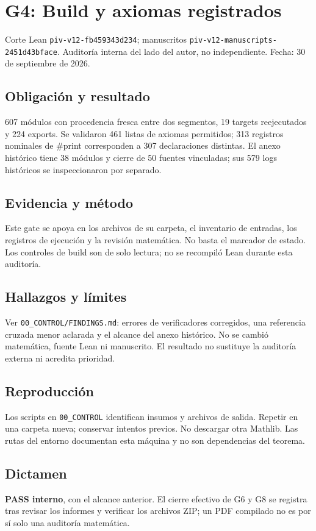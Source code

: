 \section{G4: Build y axiomas
registrados}\label{g4-build-y-axiomas-registrados}

Corte Lean \texttt{piv-v12-fb459343d234}; manuscritos
\texttt{piv-v12-manuscripts-2451d43bface}. Auditoría interna del lado
del autor, no independiente. Fecha: 30 de septiembre de 2026.

\subsection{Obligación y resultado}\label{obligaciuxf3n-y-resultado}

607 módulos con procedencia fresca entre dos segmentos, 19 targets
reejecutados y 224 exports. Se validaron 461 listas de axiomas
permitidos; 313 registros nominales de \#print corresponden a 307
declaraciones distintas. El anexo histórico tiene 38 módulos y cierre de
50 fuentes vinculadas; sus 579 logs históricos se inspeccionaron por
separado.

\subsection{Evidencia y método}\label{evidencia-y-muxe9todo}

Este gate se apoya en los archivos de su carpeta, el inventario de
entradas, los registros de ejecución y la revisión matemática. No basta
el marcador de estado. Los controles de build son de solo lectura; no se
recompiló Lean durante esta auditoría.

\subsection{Hallazgos y límites}\label{hallazgos-y-luxedmites}

Ver \texttt{00\_CONTROL/FINDINGS.md}: errores de verificadores
corregidos, una referencia cruzada menor aclarada y el alcance del anexo
histórico. No se cambió matemática, fuente Lean ni manuscrito. El
resultado no sustituye la auditoría externa ni acredita prioridad.

\subsection{Reproducción}\label{reproducciuxf3n}

Los scripts en \texttt{00\_CONTROL} identifican insumos y archivos de
salida. Repetir en una carpeta nueva; conservar intentos previos. No
descargar otra Mathlib. Las rutas del entorno documentan esta máquina y
no son dependencias del teorema.

\subsection{Dictamen}\label{dictamen}

\textbf{PASS interno}, con el alcance anterior. El cierre efectivo de G6
y G8 se registra tras revisar los informes y verificar los archivos ZIP;
un PDF compilado no es por sí solo una auditoría matemática.
